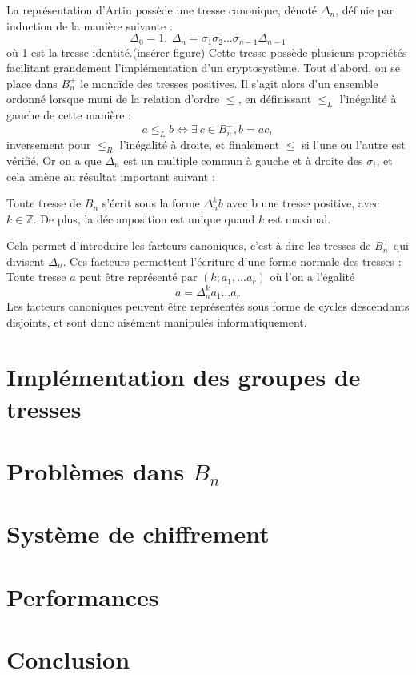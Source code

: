 \documentclass[a4paper, 100pt]{article}
\begin{document}
La représentation d'Artin possède une tresse canonique, dénoté $\Delta_n$, définie par induction de la manière suivante :
\[\Delta_0 = 1,\ \Delta_n = \sigma_1\sigma_2\dots\sigma_{n-1}\Delta_{n-1}\] où 1 est la tresse identité.(insérer figure)
Cette tresse possède plusieurs propriétés facilitant grandement l'implémentation d'un cryptosystème. Tout d'abord, on se place dans $B_n^+$ le monoïde des tresses positives. Il s'agit alors d'un ensemble ordonné lorsque muni de la relation d'ordre $\leq$, en définissant $\leq_L$ l'inégalité à gauche de cette manière : \[a \leq_L b \iff \exists \ c \in B_n^+, b = ac,\] inversement pour $\leq_R$ l'inégalité à droite, et finalement $\leq$ si l'une ou l'autre est vérifié.
Or on a que $\Delta_n$ est un multiple commun à gauche et à droite des $\sigma_i$, et cela amène au résultat important suivant :

Toute tresse de $B_n$ s'écrit sous la forme $\Delta_n^{k}b$ avec b une tresse positive, avec $k\in\mathbb{Z}$. De plus, la décomposition est unique quand $k$ est maximal.

Cela permet d'introduire les facteurs canoniques, c'est-à-dire les tresses de $B_n^+$ qui divisent $\Delta_n$. Ces facteurs permettent l'écriture d'une forme normale des tresses : Toute tresse $a$ peut être représenté par $(k;a_1,\dots a_r)$ où l'on a l'égalité \[a = \Delta_n^ka_1\dots a_r\]
Les facteurs canoniques peuvent être représentés sous forme de cycles descendants disjoints, et sont donc aisément manipulés informatiquement.

\section{Implémentation des groupes de tresses}
\section{Problèmes dans $B_n$}
\section{Système de chiffrement}
\section{Performances}
\section{Conclusion}
\end{document}
